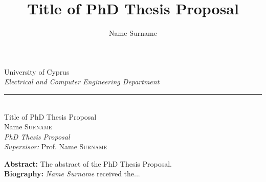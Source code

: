 \documentclass[12pt,journal,onecolumn,twoside]{IEEEtran}
\newcommand{\HRule}{\rule{\linewidth}{0.5mm}}
\begin{document}
\begin{center}  
\thispagestyle{empty}
{\Large University of Cyprus}\\
\emph{\large Electrical and Computer Engineering Department}\\
\HRule\\[0.4cm]
{\Huge  Title of PhD Thesis Proposal}\\[1cm]
\large
Name \textsc{Surname}\\[0.3cm]
\emph{\large PhD Thesis Proposal}\\[0.5cm]
\emph{Supervisor:} Prof. Name \textsc{Surname}
\vfill
\end{center}

\textbf{Abstract:} The abstract of the PhD Thesis Proposal. \\[0.5cm]

\textbf{Biography:} \textit{Name Surname} received the...


%
\title{Title of PhD Thesis Proposal}
%
%
%

\author{Name Surname}

% 
%
\end{document}
